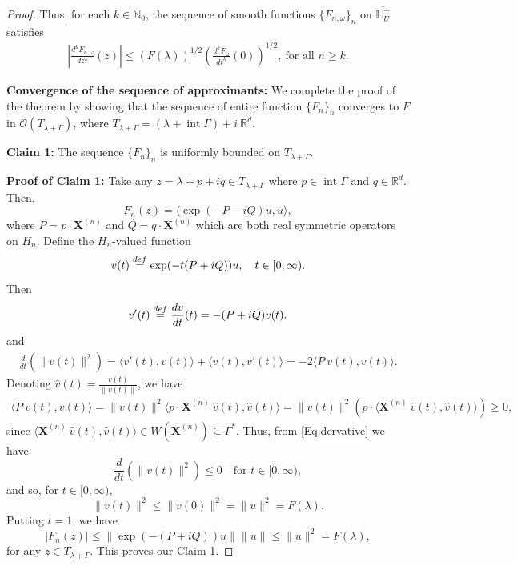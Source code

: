 \documentclass[10pt,a4paper]{amsart}
\newcommand{\bydef}{\stackrel{\rm def}{=}}
\begin{document}
\begin{proof}
Thus, for each $k \in \mathbb{N}_0$, the sequence of smooth functions $\{F_{n, \omega}\}_n$ on $\overline{\mathbb{H}^+_U}$ satisfies
\begin{align} \label{Eq:Arzela-cond}
    \left| \frac{d^k F_{n, \omega}}{dz^k}(z) \right|  \leq (F(\lambda))^{1/2} \left(\frac{d^k F_\omega}{d t^k}(0)\right)^{1/2}, \ \text{for all } n \geq k. 
\end{align}

\vspace{2mm}
    
\noindent \textbf{Convergence of the sequence of approximants:} We complete the proof of the theorem by showing that the sequence of entire function $\{F_n\}_n$ converges to $F$ in $\mathcal{O}(T_{\lambda + \Gamma})$, where $T_{\lambda + \Gamma} = (\lambda + \operatorname{int} \Gamma) + i \ \mathbb{R}^d$.

\vspace{2mm}

\noindent \textbf{Claim 1:} The sequence $\{F_n\}_n$ is uniformly bounded on $T_{\lambda + \Gamma}$.

\noindent \textbf{Proof of Claim 1:} Take any $z= \lambda + p + i q \in T_{\lambda + \Gamma}$ where $p \in \operatorname{int} \Gamma$ and $q\in \mathbb{R}^d$. Then,
$$
F_n(z) = \langle \exp(-P - i Q) u, u \rangle,
$$
where $P= p \cdot \boldsymbol{X}^{(n)}$ and $Q= q\cdot \boldsymbol{X}^{(n)}$ which are both real symmetric operators on $H_n$. Define the $H_n$-valued function
   $$
   v(t) \bydef \exp(-t(P+ iQ)) u, \quad t\in [0, \infty).
   $$
Then 
$$
v'(t) \bydef \frac{d v}{dt}(t) = -(P+i Q) v(t).
$$ and 
\begin{align} \label{Eq:dervative}
    \frac{d}{dt}(\|v(t)\|^2) = \langle v'(t),  v(t) \rangle + \langle v(t), v'(t) \rangle = -2\langle  P \ v(t),  v(t)\rangle.
\end{align}
Denoting $\hat{v}(t) = \frac{v(t)}{\|v(t)\|}$, we have 
\begin{align*}
    \langle  P \ v(t),  v(t)\rangle = \|v(t)\|^2 \langle  p \cdot \boldsymbol{X}^{(n)} \ \hat{v}(t),  \hat{v}(t)\rangle = \|v(t)\|^2  (p \cdot \langle \boldsymbol{X}^{(n)} \ \hat{v}(t),  \hat{v}(t)\rangle) \geq 0, 
\end{align*}
since $\langle \boldsymbol{X}^{(n)} \ \hat{v}(t),  \hat{v}(t)\rangle \in W(\boldsymbol{X}^{(n)}) \subseteq \Gamma^*$. Thus, from \eqref{Eq:dervative} we have
$$
 \frac{d}{dt}(\|v(t)\|^2) \leq 0 \quad \text{for } t\in [0, \infty), 
$$
and so, for $t\in [0, \infty)$,
$$
\|v(t)\|^2 \leq \|v(0)\|^2 = \|u\|^2 = F(\lambda).
$$
Putting $t=1$, we have 
$$
|F_n(z)| \leq \|\exp(-(P+iQ))u \| \|u\| \leq \|u\|^2 = F(\lambda),
$$
for any $z \in T_{\lambda + \Gamma}$. This proves our Claim 1.


\end{proof}
\end{document}
